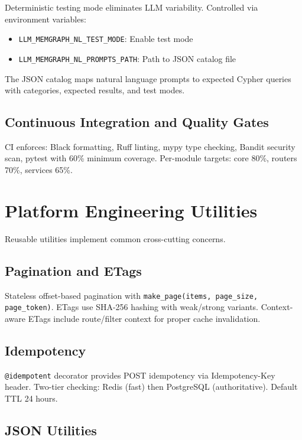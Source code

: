 \documentclass[a4paper,twoside]{sapthesis}
\begin{document}
Deterministic testing mode eliminates LLM variability. Controlled via environment variables:
\begin{itemize}
    \item \texttt{LLM\_MEMGRAPH\_NL\_TEST\_MODE}: Enable test mode
    \item \texttt{LLM\_MEMGRAPH\_NL\_PROMPTS\_PATH}: Path to JSON catalog file
\end{itemize}

The JSON catalog maps natural language prompts to expected Cypher queries with categories, expected results, and test modes.

\subsection{Continuous Integration and Quality Gates}
\label{subsec:ci-quality-gates}

CI enforces: Black formatting, Ruff linting, mypy type checking, Bandit security scan, pytest with 60\% minimum coverage. Per-module targets: core 80\%, routers 70\%, services 65\%.

\section{Platform Engineering Utilities}
\label{sec:platform-utilities}

Reusable utilities implement common cross-cutting concerns.

\subsection{Pagination and ETags}
\label{subsec:pagination}

Stateless offset-based pagination with \texttt{make\_page(items, page\_size, page\_token)}. ETags use SHA-256 hashing with weak/strong variants. Context-aware ETags include route/filter context for proper cache invalidation.

\subsection{Idempotency}
\label{subsec:idempotency}

\texttt{@idempotent} decorator provides POST idempotency via Idempotency-Key header. Two-tier checking: Redis (fast) then PostgreSQL (authoritative). Default TTL 24 hours.

\subsection{JSON Utilities}
\label{subsec:json-utils}
\end{document}
